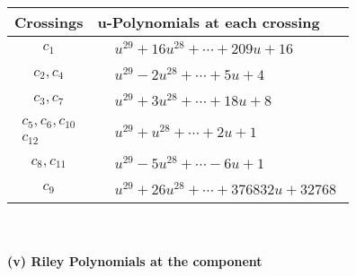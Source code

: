 \documentclass[1p]{elsarticle_modified}
\theoremstyle{definition}
\begin{document}
\begin{tabular}{m{50pt}|m{274pt}}
Crossings & \hspace{64pt}u-Polynomials at each crossing \\
\hline $$\begin{aligned}c_{1}\end{aligned}$$&$\begin{aligned}
&u^{29}+16 u^{28}+\cdots+209 u+16
\end{aligned}$\\
\hline $$\begin{aligned}c_{2},c_{4}\end{aligned}$$&$\begin{aligned}
&u^{29}-2 u^{28}+\cdots+5 u+4
\end{aligned}$\\
\hline $$\begin{aligned}c_{3},c_{7}\end{aligned}$$&$\begin{aligned}
&u^{29}+3 u^{28}+\cdots+18 u+8
\end{aligned}$\\
\hline $$\begin{aligned}c_{5},c_{6},c_{10}\\c_{12}\end{aligned}$$&$\begin{aligned}
&u^{29}+u^{28}+\cdots+2 u+1
\end{aligned}$\\
\hline $$\begin{aligned}c_{8},c_{11}\end{aligned}$$&$\begin{aligned}
&u^{29}-5 u^{28}+\cdots-6 u+1
\end{aligned}$\\
\hline $$\begin{aligned}c_{9}\end{aligned}$$&$\begin{aligned}
&u^{29}+26 u^{28}+\cdots+376832 u+32768
\end{aligned}$\\
\hline
\end{tabular}\\~\\
\newpage\renewcommand{\arraystretch}{1}
\flushleft \textbf{(v) Riley Polynomials at the component}\newline \\
\end{document}
